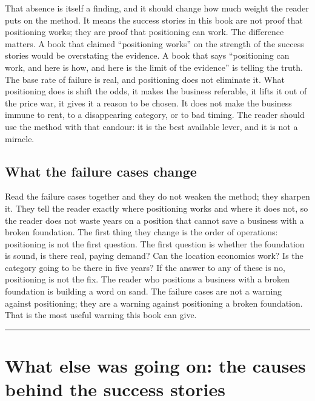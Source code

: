 \documentclass[10pt,twoside,openany]{memoir}
\newcommand{\needspacehead}{\needspace{4\baselineskip}}
\let\oldsection\section
\renewcommand{\section}{\needspacehead\oldsection}
\begin{document}
{That absence is itself a finding, and it should change how much weight
the reader puts on the method. It means the success stories in this book
are not proof that positioning works; they are proof that positioning
can work. The difference matters. A book that claimed ``positioning
works'' on the strength of the success stories would be overstating the
evidence. A book that says ``positioning can work, and here is how, and
here is the limit of the evidence'' is telling the truth. The base rate
of failure is real, and positioning does not eliminate it. What
positioning does is shift the odds, it makes the business referable, it
lifts it out of the price war, it gives it a reason to be chosen. It
does not make the business immune to rent, to a disappearing category,
or to bad timing. The reader should use the method with that candour: it
is the best available lever, and it is not a miracle.

\section{What the failure cases
change}\label{what-the-failure-cases-change}

Read the failure cases together and they do not weaken the method; they
sharpen it. They tell the reader exactly where positioning works and
where it does not, so the reader does not waste years on a position that
cannot save a business with a broken foundation. The first thing they
change is the order of operations: positioning is not the first
question. The first question is whether the foundation is sound, is
there real, paying demand? Can the location economics work? Is the
category going to be there in five years? If the answer to any of these
is no, positioning is not the fix. The reader who positions a business
with a broken foundation is building a word on sand. The failure cases
are not a warning against positioning; they are a warning against
positioning a broken foundation. That is the most useful warning this
book can give.

\begin{center}\rule{0.5\linewidth}{0.5pt}\end{center}

\FloatBarrier
\chapter{What else was going on: the causes behind the success
stories}\label{what-else-was-going-on-the-causes-behind-the-success-stories}

}
\end{document}
